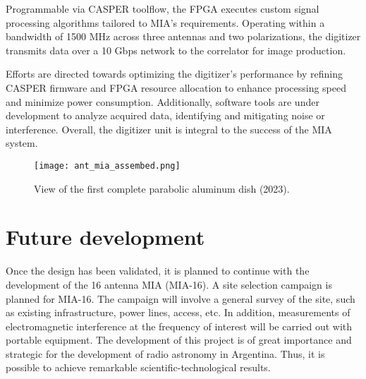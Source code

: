 \documentclass[baaa]{baaa}
\begin{document}
Programmable via CASPER toolflow, the FPGA executes custom signal processing algorithms tailored to MIA's requirements. Operating within a bandwidth of 1500 MHz across three antennas and two polarizations, the digitizer transmits data over a 10 Gbps network to the correlator for image production.

Efforts are directed towards optimizing the digitizer's performance by refining CASPER firmware and FPGA resource allocation to enhance processing speed and minimize power consumption. Additionally, software tools are under development to analyze acquired data, identifying and mitigating noise or interference. Overall, the digitizer unit is integral to the success of the MIA system.

\begin{figure}[!t]
  \texttt{[image: ant\_mia\_assembed.png]}
  \caption{{View of the first complete parabolic aluminum dish (2023).}}
  \label{fig:complete}
\end{figure}

\section{Future development}
Once the design has been validated, it is planned to continue with the development of the 16 antenna MIA (MIA-16). A site selection campaign is planned for MIA-16. The campaign will involve a general survey of the site, such as existing infrastructure, power lines, access, etc. In addition, measurements of electromagnetic interference at the frequency of interest will be carried out with portable equipment. The development of this project is of great importance and strategic for the development of radio astronomy in Argentina. Thus, it is possible to achieve remarkable scientific-technological results.
\end{document}
